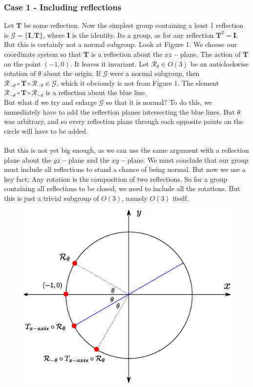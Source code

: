 \subsubsection*{Case 1 - Including reflections}
Let $\mathbf{T}$ be some reflection. Now the simplest group containing a least 1 reflection is $\mathcal{G}=\{\mathbf{I},\mathbf{T}\}$, where $\mathbf{I}$ is the identity. Its a group, as for any reflection $\mathbf{T}^2=\mathbf{I}$. But this is certainly not a normal subgroup. Look at Figure 1. We choose our coordinate system so that $\mathbf{T}$ is a reflection about the $xz-$plane. The action of $\mathbf{T}$ on the point $(-1,0)$. It leaves it invariant. Let $\mathcal{R}_\theta\in O(3)$ be an anticlockwise rotation of $\theta$ about the origin. If $\mathcal{G}$ were a normal subgroup, then $\mathcal{R}_{-\theta}\circ\mathbf{T}\circ \mathcal{R}_{-\theta}\in \mathcal{G}$, which it obviously is not from Figure 1. The element $\mathcal{R}_{-\theta}\circ\mathbf{T}\circ \mathcal{R}_{-\theta}$ is a reflection about the blue line. \\ But what if we try and enlarge $\mathcal{G}$ so that it is normal? To do this, we immediately have to add the reflection planes intersecting the blue lines. But $\theta$ was arbitrary, and so every reflection plane through each opposite points on the circle will have to be added.\\ \\ But this is not yet big enough, as we can use the same argument with a reflection plane about the $yz-$plane and the $xy-$plane. We must conclude that our group must include all reflections to stand a chance of being normal. But now we use a key fact: Any rotation is the composition of two reflections. So for a group containing all reflections to be closed, we need to include all the rotations. But this is just a trivial subgroup of $O(3)$, namely $O(3)$ itself.  
\begin{figure}
\includegraphics[scale=0.6]{chapters/images/13.7.eps}
\caption{}
\end{figure} 
